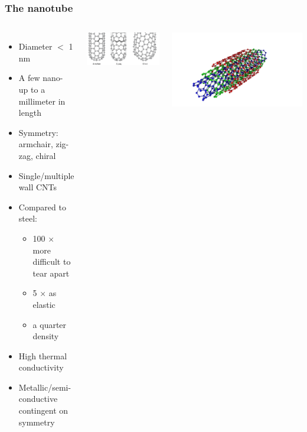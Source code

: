 \documentclass{beamer}
\begin{document}
\begin{frame}
	\frametitle{The nanotube}
	\begin{columns}
		\begin{itemize}
			\item Diameter $<$ 1 nm
			\item A few nano- up to a millimeter in length
			\item Symmetry: armchair, zig-zag, chiral
			\item Single/multiple wall CNTs
			\item Compared to steel:
				\begin{itemize}
					\item 100 $\times$ more difficult to tear apart
					\item 5 $\times$ as elastic
					\item a quarter density
				\end{itemize}
			\item High thermal conductivity
			\item Metallic/semi-conductive contingent on symmetry
		\end{itemize}
		\begin{minipage}{.5\textheight}
			\includegraphics[scale=.65]{nanotube_orientations}
		\end{minipage}
	\begin{minipage}{.5\textheight}
		\includegraphics[scale=.1]{MWCNT}
	\end{minipage}
	\end{columns}
\end{frame}
\end{document}
